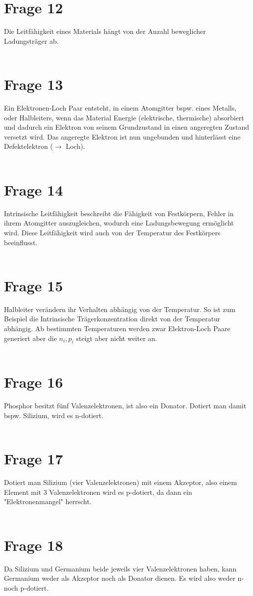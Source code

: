 \documentclass[a4paper]{scrartcl}
\begin{document}
\section*{Frage 12}
Die Leitfähigkeit eines Materials hängt von der Anzahl beweglicher Ladungsträger ab.
~\\
~\\
\section*{Frage 13}
Ein Elektronen-Loch Paar entsteht, in einem Atomgitter bspw. eines Metalls, oder Halbleiters, wenn das Material Energie (elektrische, thermische) absorbiert und dadurch ein Elektron von seinem Grundzustand in einen angeregten Zustand versetzt wird. Das angeregte Elektron ist nun ungebunden und hinterlässt eine Defektelektron ($\rightarrow$ Loch).
~\\
~\\
\section*{Frage 14}
Intrinsische Leitfähigkeit beschreibt die Fähigkeit von Festkörpern, Fehler in ihrem Atomgitter auszugleichen, wodurch eine Ladungsbewegung ermöglicht wird. Diese Leitfähigkeit wird auch von der Temperatur des Festkörpers beeinflusst.
~\\
~\\
\section*{Frage 15}
Halbleiter verändern ihr Verhalten abhängig von der Temperatur. So ist zum Beispiel die Intrinsische Trägerkonzentration direkt von der Temperatur abhängig. Ab bestimmten Temperaturen werden zwar Elektron-Loch Paare generiert aber die $n_i, p_i$ steigt aber nicht weiter an.
~\\
~\\
\section*{Frage 16}
Phosphor besitzt fünf Valenzelektronen, ist also ein Donator. Dotiert man damit bspw. Silizium, wird es n-dotiert.
~\\
~\\
\section*{Frage 17}
Dotiert man Silizium (vier Valenzelektronen) mit einem Akzeptor, also einem Element mit 3 Valenzelektronen wird es p-dotiert, da dann ein "Elektronenmangel" herrscht.
~\\
~\\
\section*{Frage 18}
Da Silizium und Germanium beide jeweils vier Valenzelektronen haben, kann Germanium weder als Akzeptor noch als Donator dienen. Es wird also weder n- noch p-dotiert.
~\\
~\\
\end{document}
